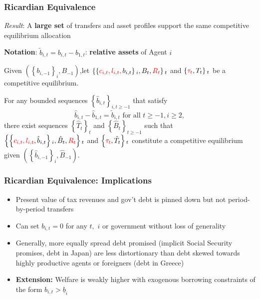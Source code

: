 \documentclass{beamer}
\begin{document}
 \begin{frame}
  \frametitle{Ricardian Equivalence}
\emph{Result}: A \textbf{large set} of transfers and asset profiles support the same competitive equilibrium allocation

\textbf{Notation}: $\tilde{b}_{i,t}=b_{i,t}-b_{1,t}$: \textbf{relative assets} of Agent $i$
  \small
 \begin{theorem}
 Given $\left( \left \{ b_{i,-1}\right \} _{i},B_{-1}\right) $,let $\left \{ \left \{ \color{red}{c}_{i,t},l_{i,t},\color{black}b_{i,t}\right \} _{i},B_{t},\color{red}{R}_{t}\color{black}\right \} _{t} $ and $\left \{ \color{red}\tau _{t}\color{black},T_{t}\right\} _{t}$ be a competitive equilibrium.

 For any bounded sequences $\left \{ \hat{b}_{i,t}\right \} _{i,t\geq -1}$ that satisfy
 \begin{equation*}
 \hat{b}_{i,t}-\hat{b}_{1,t}=\tilde{b}_{i,t}\text{ for all }t\geq -1,i\geq 2,
 \end{equation*}%
 there exist  sequences $\left \{ \hat{T}_{t}\right \} _{t}$ and $%
 \left \{ \hat{B}_{t}\right \} _{t\geq -1}$ such that $\left \{ \left \{ \color{red}{c}_{i,t},l_{i,t}\color{black},\hat{b}%
 _{i,t}\right \} _{i},\hat{B}_{t},\color{red}{R}_{t}\color{black}\right \} _{t}$ and $\left \{
 \color{red}{\tau}_{t}\color{black},\hat{T}_{t}\right \} _{t}$ constitute a competitive
 equilibrium given $\left( \left \{ \hat{b}_{i,-1}\right \} _{i},\hat{B}%
 _{-1}\right) $.
 \end{theorem}
\end{frame}

\begin{frame}\label{ricardian eqv}
 \frametitle{Ricardian Equivalence: Implications}
 \begin{itemize}
\item Present value of tax revenues and gov't debt is pinned down but not period-by-period transfers

\item Can set $b_{i,t}=0$ for any $t,$ $i$ or government without loss of
generality

 \item Generally, more equally spread debt promised (implicit Social Security
promises, debt in Japan) are less distortionary than debt skewed towards
highly productive agents or foreigners (debt in Greece)

 \item \textbf{Extension:} Welfare is weakly higher with exogenous borrowing constraints of the form $b_{i,t}>\underline{b}_i$ 

\hyperlink{credit limits}{}

\end{itemize}
\end{frame}
\end{document}
